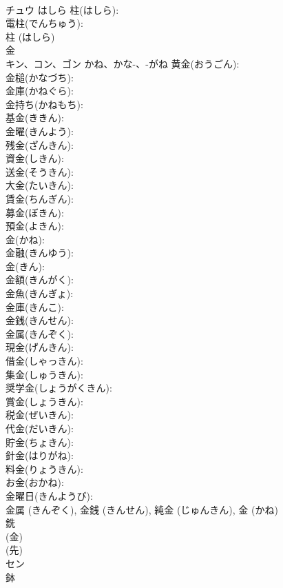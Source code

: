 \documentclass[8pt]{extreport}
\begin{document}
\begin{CJK}{UTF8}{min}
\\	チュウ	はしら	柱(はしら): 
\\	電柱(でんちゅう): 
\\	柱 (はしら)
\\	金			
\\	キン、コン、ゴン	かね、かな-、-がね	黄金(おうごん): 
\\	金槌(かなづち): 
\\	金庫(かねぐら): 
\\	金持ち(かねもち): 
\\	基金(ききん): 
\\	金曜(きんよう): 
\\	残金(ざんきん): 
\\	資金(しきん): 
\\	送金(そうきん): 
\\	大金(たいきん): 
\\	賃金(ちんぎん): 
\\	募金(ぼきん): 
\\	預金(よきん): 
\\	金(かね): 
\\	金融(きんゆう): 
\\	金(きん): 
\\	金額(きんがく): 
\\	金魚(きんぎょ): 
\\	金庫(きんこ): 
\\	金銭(きんせん): 
\\	金属(きんぞく): 
\\	現金(げんきん): 
\\	借金(しゃっきん): 
\\	集金(しゅうきん): 
\\	奨学金(しょうがくきん): 
\\	賞金(しょうきん): 
\\	税金(ぜいきん): 
\\	代金(だいきん): 
\\	貯金(ちょきん): 
\\	針金(はりがね): 
\\	料金(りょうきん): 
\\	お金(おかね): 
\\	金曜日(きんようび): 
\\	金属 (きんぞく), 金銭 (きんせん), 純金 (じゅんきん), 金 (かね)
\\	銑			
\\	(金) 
\\	(先) 
\\	セン			
\\	鉢			

\end{CJK}
\end{document}
